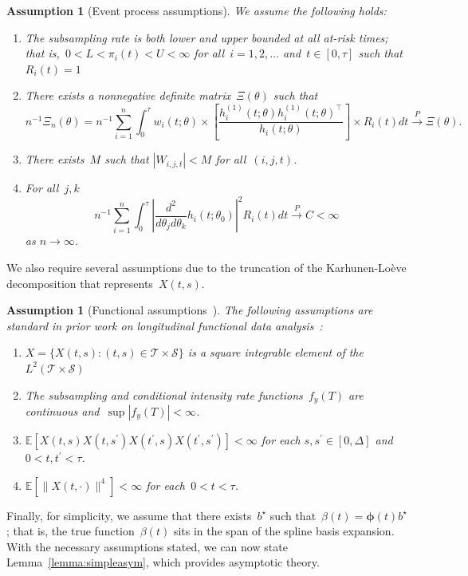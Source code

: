 \documentclass[12pt]{amsart}
\def\E{\mathcal{E}}
\newtheorem{assumption}[thm]{Assumption}
\def\E{\mathbb{E}}
\begin{document}
\begin{assumption}[Event process assumptions]
\label{assumption:events}\normalfont
We assume the following holds:
\begin{enumerate}[label=(E.\arabic*)]
\item\label{E1} The subsampling rate is both lower and upper bounded at all at-risk times; that is,~$0 < L < \pi_i (t) < U < \infty$ for all~$i=1,2,\ldots$ and~$t \in [0,\tau]$ such that $R_i (t) = 1$
\item\label{E2} There exists a nonnegative definite matrix~$\Xi (\theta)$ such that
  \[
    n^{-1} \Xi_n (\theta) = n^{-1} \sum_{i=1}^n \int_0^\tau w_i (t; \theta) \times \left[ \frac{h_i^{(1)}(t; \theta) h_i^{(1)} (t;\theta)^\top}{h_i (t; \theta)} \right] \times   R_i (t) dt \overset{P}{\to} \Xi (\theta).
  \]
\item\label{E3} There exists~$M$ such that $|W_{i,j,t}| < M$ for all~$(i,j,t)$.
\item\label{E4} For all~$j,k$
\[
n^{-1} \sum_{i=1}^n \int_0^\tau \left | \frac{d^2}{d\theta_j
    d\theta_k} h_i (t;\theta_0) \right|^2 R_i (t) dt \overset{P}{\to}
C < \infty
\]
as $n \to \infty$.
\end{enumerate}
\end{assumption}

We also require several assumptions due to the truncation of the Karhunen-Lo{\`e}ve decomposition that represents~$X(t,s)$.
\begin{assumption}[Functional assumptions~\citep{Park2018}] \normalfont
\label{assumption:truncation}
The following assumptions are standard in prior work on longitudinal functional data analysis~\citep{Park2018, Yao2005, ChenMuller2012}:
\begin{enumerate}[label=(A.\arabic*)]
\item\label{A1} $X = \{ X(t, s) : (t,s) \in \mathcal{T} \times
  \mathcal{S} \}$ is a square integrable element of the $L^2 (
  \mathcal{T} \times \mathcal{S})$
\item\label{A2} The subsampling and conditional intensity rate functions~$f_y(T)$ are continuous and~$\sup |f_y(T)| < \infty$.
\item\label{A3} $\E[X(t,s) X(t,s^\prime) X(t^\prime,s) X(t^\prime, s^\prime) ] < \infty$ for each $s,s^\prime \in [0,\Delta]$ and~$0 < t, t^\prime < \tau$.
\item\label{A4} $\E[\|X(t,\cdot)\|^4] < \infty$ for each~$0< t < \tau$.
\end{enumerate}
\end{assumption}
Finally, for simplicity, we assume that there exists~$b^\star$ such that~$\beta(t) = \mathbold{\phi} (t) b^\star$; that is, the true function~$\beta(t)$ sits in the span of the spline basis expansion. With the necessary assumptions stated, we can now state Lemma~\ref{lemma:simpleasym}, which provides asymptotic theory.
\end{document}
